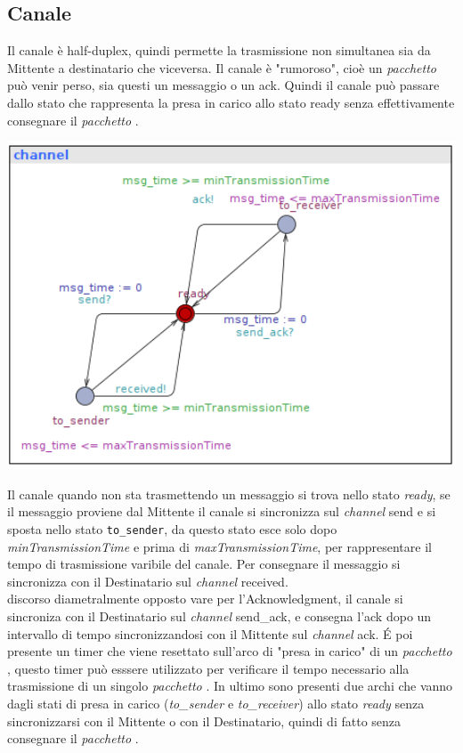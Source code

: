 \documentclass[a4paper]{article}
\newcommand{\channel}{\textit{channel }}
\newcommand{\pacchetto}{\textit{pacchetto }}
\begin{document}
\subsection{Canale}
Il canale è half-duplex, quindi permette la trasmissione non simultanea sia da Mittente a destinatario che viceversa.
Il canale è "rumoroso", cioè un \textit{\pacchetto}può venir perso, sia questi un messaggio o un ack. Quindi il canale può passare dallo stato che rappresenta la presa in carico allo stato ready senza effettivamente consegnare il \pacchetto.\\
\begin{center}\includegraphics[width=1\textwidth]{channel_unsafe.png}\end{center}
Il canale quando non sta trasmettendo un messaggio si trova nello stato \textit{ready}, se il messaggio proviene dal Mittente il canale si sincronizza sul \channel send e si sposta nello stato \texttt{to\_sender}, da questo stato esce solo dopo \textit{minTransmissionTime} e prima di \textit{maxTransmissionTime}, per rappresentare il tempo di trasmissione varibile del canale.
Per consegnare il messaggio si sincronizza con il Destinatario sul \channel received.\\
discorso diametralmente opposto vare per l'Acknowledgment, il canale si sincroniza con il Destinatario sul \channel send\_ack, e consegna l'ack dopo un intervallo di tempo sincronizzandosi con il Mittente sul \channel ack.
É poi presente un timer che viene resettato sull'arco di "presa in carico" di un \pacchetto, questo timer può esssere utilizzato per verificare il tempo necessario alla trasmissione di un singolo \pacchetto.
In ultimo sono presenti due archi che vanno dagli stati di presa in carico (\textit{to\_sender} e \textit{to\_receiver}) allo stato \textit{ready} senza sincronizzarsi con il Mittente o con il Destinatario, quindi di fatto senza consegnare il \pacchetto.
\end{document}
